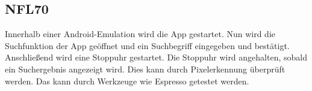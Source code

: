 \subsection*{NFL70}

Innerhalb einer \Gls{Android}-\Gls{Emulation} wird die App gestartet.
Nun wird die Suchfunktion der App geöffnet und ein Suchbegriff eingegeben und bestätigt.
Anschließend wird eine Stoppuhr gestartet.
Die Stoppuhr wird angehalten, sobald ein Suchergebnis angezeigt wird.
Dies kann durch Pixelerkennung überprüft werden.
Das kann durch Werkzeuge wie \Gls{Espresso} getestet werden.
